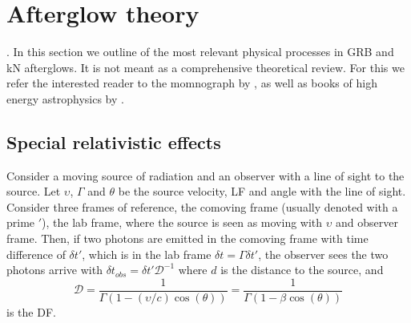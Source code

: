 %
%





\section{Afterglow theory}

.
In this section we outline of the most relevant physical processes in \ac{GRB}
and \ac{kN} afterglows. It is not meant as a comprehensive theoretical review. 
For this we refer the interested reader to the momnograph by \citet{RybickiLightman:1985}, 
as well as books of high energy astrophysics by \citet{Longair:2011,Dermer:2009}.


\subsection{Special relativistic effects}

Consider a moving source of radiation and an observer with a line of sight to the source.
Let $\upsilon$, $\Gamma$ and $\theta$ be the source velocity, 
\ac{LF} and angle with the line of sight.
%
Consider three frames of reference, the comoving frame (usually denoted with a prime $'$),
the lab frame, where the source is seen as moving with $\upsilon$ and observer frame.
Then, if two photons are emitted in the comoving frame with time difference of $\delta t'$,
which is in the lab frame $\delta t = \Gamma \delta t'$, the observer sees the two 
photons arrive with 
%
%
$\delta t_{obs} = \delta t' \mathcal{D}^{-1}$
%
where $d$ is the distance to the source, and 
%
\begin{equation}
\mathcal{D} = \frac{1}{\Gamma(1 - (\upsilon/c) \cos(\theta))} = \frac{1}{\Gamma(1 - \beta\cos(\theta))}
\label{eq:afterglow:dop_fac}
\end{equation}
%
is the \ac{DF}. 


